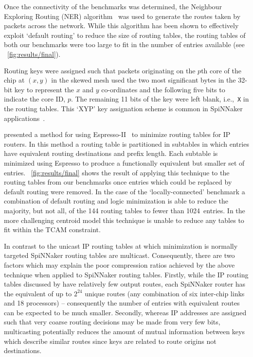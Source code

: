 \documentclass[conference]{IEEEtran}
\newcommand{\mytt}[1]{\texttt{\footnotesize#1}}
\begin{document}
Once the connectivity of the benchmarks was determined, the Neighbour Exploring Routing (NER) algorithm~\parencite{Navaridas2015} was used to generate the routes taken by packets across the network.
While this algorithm has been shown to effectively exploit `default routing' to reduce the size of routing tables, the routing tables of both our benchmarks were too large to fit in the number of entries available (see \figurename~\ref{fig:results/final}).

Routing keys were assigned such that packets originating on the $p$th core of the chip at $(x, y)$ in the skewed mesh used the two most significant bytes in the 32-bit key to represent the $x$ and $y$ co-ordinates and the following five bits to indicate the core ID, $p$.
The remaining 11 bits of the key were left blank, i.e.,~\mytt{X} in the routing tables.
This `XYP' key assignation scheme is common in SpiNNaker applications~\parencite{Davies2012}.

\textcite{Liu2002} presented a method for using Espresso-II~\parencite{Brayton1984} to minimize routing tables for IP routers.
In this method a routing table is partitioned in subtables in which entries have equivalent routing destinations and prefix length.
Each subtable is minimized using Espresso to produce a functionally equivalent but smaller set of entries.
\figurename~\ref{fig:results/final} shows the result of applying this technique to the routing tables from our benchmarks once entries which could be replaced by default routing were removed.
In the case of the `locally-connected' benchmark a combination of default routing and logic minimization is able to reduce the majority, but not all, of the 144 routing tables to fewer than \num{1024}~entries.
In the more challenging centroid model this technique is unable to reduce any tables to fit within the TCAM constraint.

In contrast to the unicast IP routing tables at which minimization is normally targeted SpiNNaker routing tables are multicast.
Consequently, there are two factors which may explain the poor compression ratios achieved by the above technique when applied to SpiNNaker routing tables.
Firstly, while the IP routing tables discussed by \textcite{Liu2002} have relatively few output routes, each SpiNNaker router has the equivalent of up to $2^{24}$ unique routes (any combination of six inter-chip links and 18 processors) -- consequently the number of entries with equivalent routes can be expected to be much smaller.
Secondly, whereas IP addresses are assigned such that very coarse routing decisions may be made from very few bits, multicasting potentially reduces the amount of mutual information between keys which describe similar routes since keys are related to route origins not destinations.
\end{document}
